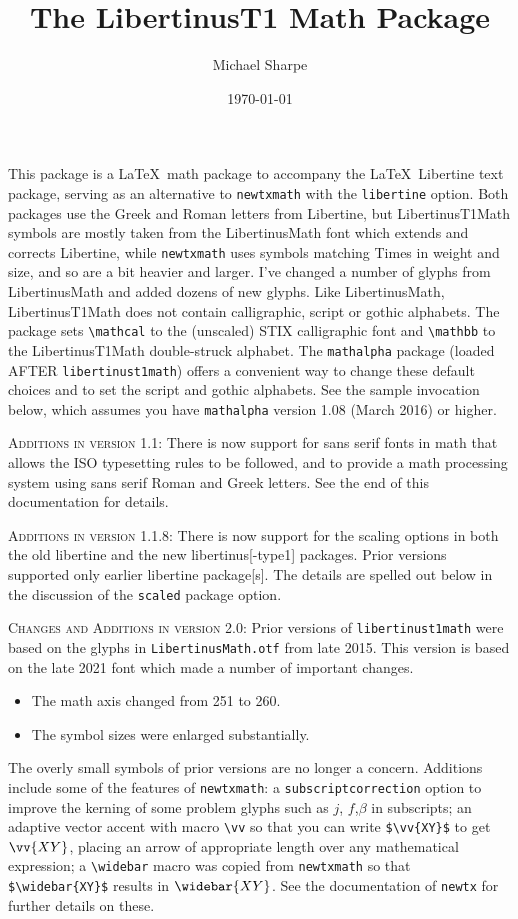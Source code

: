 \documentclass{article}
\title{The LibertinusT1 Math Package}
\author{Michael Sharpe}
\date{\today}  %
\begin{document}
\maketitle

This package is a \LaTeX\ math package to accompany the \LaTeX\ Libertine text package, serving as an alternative to {\tt newtxmath} with the {\tt libertine} option. Both packages use the Greek and Roman letters from Libertine, but LibertinusT1Math symbols are mostly taken from the LibertinusMath font which extends and corrects  Libertine, while {\tt newtxmath} uses symbols matching Times in weight and size, and so are a bit heavier and larger. I've changed a number of glyphs from LibertinusMath and added dozens of new glyphs. Like LibertinusMath, LibertinusT1Math does not contain calligraphic, script or gothic alphabets. The package sets \verb|\mathcal| to the (unscaled) STIX calligraphic font and \verb|\mathbb| to the LibertinusT1Math double-struck alphabet.  The {\tt mathalpha} package (loaded AFTER {\tt libertinust1math}) offers a convenient way to change these default choices and to set the script and gothic alphabets. See the sample invocation below, which assumes you have {\tt mathalpha} version 1.08 (March 2016) or higher. 

\textsc{Additions in version 1.1:}
There is now support for sans serif fonts in math that allows the ISO typesetting rules to be followed, and to provide a math processing system using sans serif Roman and Greek letters. See the end of this documentation for details.

\textsc{Additions in version 1.1.8:}
There is now support for the scaling options in both the old libertine and the new libertinus[-type1] packages. Prior versions supported only  earlier libertine package[s]. The details are spelled out below in the discussion of the {\tt scaled} package option.
 
\textsc{Changes and Additions in version 2.0:}
Prior versions of {\tt libertinust1math} were based on the glyphs in {\tt LibertinusMath.otf} from late 2015. This version is based on the late 2021 font which made a number of important changes.
\begin{itemize}
\item
The math axis changed from 251 to 260.
\item The symbol sizes were enlarged substantially.
\end{itemize}
The overly small symbols of prior versions are no longer a concern.
Additions include some of the features of {\tt newtxmath}: a {\tt subscriptcorrection} option to improve the kerning of some problem glyphs such as $j$, $f$,$\beta$ in subscripts; an adaptive vector accent with macro \verb|\vv| so that you can write \verb|$\vv{XY}$| to get $\vv{XY}$,  placing an arrow of appropriate length over any mathematical expression; a \verb|\widebar| macro was copied from {\tt newtxmath} so that \verb|$\widebar{XY}$| results in $\widebar{XY}$. See the documentation of {\tt newtx} for further details on these.
\end{document}
